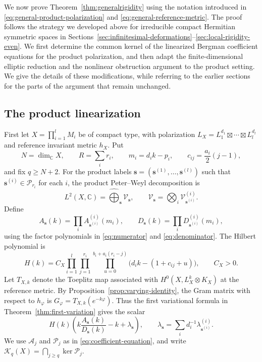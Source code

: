\documentclass[11pt,reqno]{amsart}
\theoremstyle{corollary}
\theoremstyle{conjecture}
\theoremstyle{assumption}
\theoremstyle{proposition}
\theoremstyle{remark}
\numberwithin{equation}{section}
\begin{document}
We now prove Theorem~\ref{thm:generalrigidity} using the notation introduced in \eqref{eq:general-product-polarization} and \eqref{eq:general-reference-metric}. The proof follows the strategy we developed above for irreducible compact Hermitian symmetric spaces in Sections~\ref{sec:infinitesimal-deformations}--\ref{sec:local-rigidity-even}. We first determine the common kernel of the linearized Bergman coefficient equations for the product polarization, and then adapt the finite-dimensional elliptic reduction and the nonlinear obstruction argument to the product setting. We give the details of these modifications, while referring to the earlier sections for the parts of the argument that remain unchanged.

\subsection{The product linearization}

First let $X=\prod_{i=1}^{l}M_i$ be of compact type, with polarization $L_X=L_1^{d_1}\boxtimes\cdots\boxtimes L_l^{d_l}$ and reference invariant metric $h_X$. Put
\[
 N=\dim_{\mathbb C}X,\qquad R=\sum_i r_i,\qquad m_i=d_i k-p_i,\qquad c_{ij}=\frac{a_i}{2}(j-1),
\]
and fix $q\geq N+2$. For the product labels $\mathbf s=(\mathbf s^{(1)},\ldots,\mathbf s^{(l)})$ such that $\mathbf s^{(i)}\in \mathcal P_{r_i}$ for each $i$, the product Peter--Weyl decomposition is
\[
 L^2(X,\mathbb C)=\widehat{\bigoplus}_{\mathbf s}\mathcal V_{\mathbf s}, \qquad \mathcal V_{\mathbf s} =\bigotimes_i\mathcal V_{\mathbf s^{(i)}}^{(i)}.
\]
Define
\[
 A_{\mathbf s}(k)=\prod_i A_{\mathbf s^{(i)}}^{(i)}(m_i), \qquad D_{\mathbf s}(k)=\prod_i D_{\mathbf s^{(i)}}^{(i)}(m_i),
\]
using the factor polynomials in \eqref{eq:numerator} and \eqref{eq:denominator}. The Hilbert polynomial is
\[
 H(k)=C_X\prod_{i=1}^{l}\prod_{j=1}^{r_i} \prod_{u=0}^{b_i+a_i(r_i-j)} \bigl(d_i k-(1+c_{ij}+u)\bigr),\qquad C_X>0.
\]
Let $T_{X,k}$ denote the Toeplitz map associated with $H^0(X,L_X^k\otimes K_X)$ at the reference metric. By Proposition~\ref{prop:varying-identity}, the Gram matrix with respect to $h_{\varphi}$ is $G_\varphi=T_{X,k}(e^{-k\varphi})$. Thus the first variational formula in Theorem~\ref{thm:first-variation} gives the scalar
\begin{equation}\label{eq:prod-linear-scalar}
 H(k)\left(k\frac{A_{\mathbf s}(k)}{D_{\mathbf s}(k)}-k+\lambda_{\mathbf s}\right),\qquad\lambda_{\mathbf s}=\sum_id_i^{-1}\lambda_{\mathbf s^{(i)}}^{(i)}.
\end{equation}
We use $\mathcal A_j$ and $\mathcal P_j$ as in \eqref{eq:coefficient-equation}, and write $\mathcal K_q(X)=\bigcap_{j\geq q}\ker\mathcal P_j$.
\end{document}
